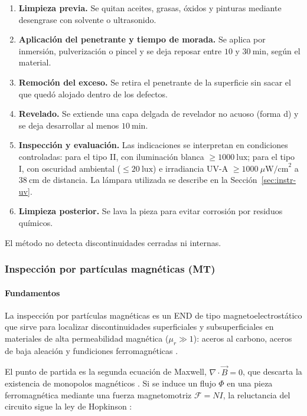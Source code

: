 \begin{enumerate}
  \item \textbf{Limpieza previa.} Se quitan aceites, grasas, óxidos y pinturas
        mediante desengrase con solvente o ultrasonido.
  \item \textbf{Aplicación del penetrante y tiempo de morada.} Se aplica por
        inmersión, pulverización o pincel y se deja reposar entre $10$ y
        $30\ \text{min}$, según el material.
  \item \textbf{Remoción del exceso.} Se retira el penetrante de la superficie sin
        sacar el que quedó alojado dentro de los defectos.
  \item \textbf{Revelado.} Se extiende una capa delgada de revelador no acuoso
        (forma d) y se deja desarrollar al menos $10\ \text{min}$.
  \item \textbf{Inspección y evaluación.} Las indicaciones se interpretan en
        condiciones controladas: para el tipo II, con iluminación blanca
        $\ge 1000\ \text{lux}$; para el tipo I, con oscuridad ambiental
        ($\le 20\ \text{lux}$) e irradiancia UV-A
        $\ge 1000\ \mu\text{W/cm}^2$ a $38\ \text{cm}$ de distancia. La lámpara
        utilizada se describe en la Sección~\ref{sec:instr-uv}.
  \item \textbf{Limpieza posterior.} Se lava la pieza para evitar corrosión por
        residuos químicos.
\end{enumerate}

El método no detecta discontinuidades cerradas ni internas.

\subsubsection{Inspección por partículas magnéticas (MT)}
\label{sec:mt}

\paragraph{Fundamentos}

La inspección por partículas magnéticas es un END de tipo magnetoelectrostático que
sirve para localizar discontinuidades superficiales y subsuperficiales en materiales
de alta permeabilidad magnética ($\mu_r \gg 1$): aceros al carbono, aceros de baja
aleación y fundiciones ferromagnéticas \parencite{astm_e1444, lovejoy1993}.

El punto de partida es la segunda ecuación de Maxwell, $\nabla \cdot \vec{B} = 0$,
que descarta la existencia de monopolos magnéticos \parencite{rao2012}. Si se induce
un flujo $\Phi$ en una pieza ferromagnética mediante una fuerza magnetomotriz
$\mathcal{F} = N I$, la reluctancia del circuito sigue la ley de Hopkinson
\parencite{lovejoy1993}:

